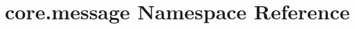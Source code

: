\hypertarget{namespacecore_1_1message}{\section{core.\-message Namespace Reference}
\label{namespacecore_1_1message}
}
